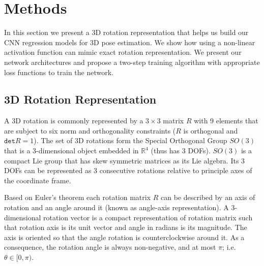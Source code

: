 \documentclass[journal,transmag]{IEEEtran}
\begin{document}
\section{Methods}
\label{sec:method}
In this section we present a 3D rotation representation that helps us build our CNN regression models for 3D pose estimation. We show how using a non-linear activation function can mimic exact rotation representation. We present our network architectures and propose a two-step training algorithm with appropriate loss functions to train the network.
\subsection{3D Rotation Representation}
\label{sec:Representation}
A 3D rotation is commonly represented by a $3 \times 3$ matrix $R$ with 9 elements that are subject to six norm and orthogonality constraints ($R$ is orthogonal and $\texttt{det}R=1$). The set of 3D rotations form the Special Orthogonal Group $SO(3)$ that is a 3-dimensional object embedded in $\mathbb{R}^4$ (thus has 3 DOFs). $SO(3)$ is a compact Lie group that has skew symmetric matrices as its Lie algebra. Its 3 DOFs can be represented as 3 consecutive rotations relative to principle axes of the coordinate frame.%

Based on Euler's theorem each rotation matrix $R$ can be described by an axis of rotation and an angle around it (known as angle-axis representation). A 3-dimensional rotation vector is a compact representation of rotation matrix such that rotation axis is its unit vector and angle in radians is its magnitude. The axis is oriented so that the angle rotation is counterclockwise around it. As a consequence, the rotation angle is always non-negative, and at most $\pi$; i.e. $\theta\in[0,\pi)$.
\end{document}
